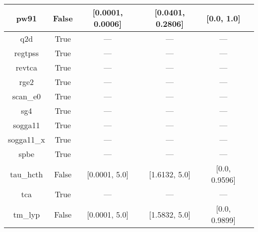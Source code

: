 \begin{tabular}{|c|c|c|c|c|l|}
          pw91 &                 False & [0.0001, 0.0006] & [0.0401, 0.2806] &     [0.0, 1.0] &          \cite{Perdew1991,Perdew1992_6671,Perdew1992_6671_err} \\ \hline
           q2d &                  True &              --- &              --- &            --- &                                       \cite{Chiodo2012_126402} \\ \hline
       regtpss &                  True &              --- &              --- &            --- &                                       \cite{Perdew2009_026403} \\ \hline
        revtca &                  True &              --- &              --- &            --- &                                        \cite{Tognetti2008_536} \\ \hline
          rge2 &                  True &              --- &              --- &            --- &                                      \cite{Ruzsinszky2009_763} \\ \hline
      scan\_e0 &                  True &              --- &              --- &            --- &                                          \cite{Sun2015_036402} \\ \hline
           sg4 &                  True &              --- &              --- &            --- &                                   \cite{Constantin2016_045126} \\ \hline
       sogga11 &                  True &              --- &              --- &            --- &                                       \cite{Peverati2011_1991} \\ \hline
    sogga11\_x &                  True &              --- &              --- &            --- &                                     \cite{Peverati2011_191102} \\ \hline
          spbe &                  True &              --- &              --- &            --- &                                        \cite{Swart2009_094103} \\ \hline
     tau\_hcth &                 False &    [0.0001, 5.0] &    [1.6132, 5.0] &  [0.0, 0.9596] &                                          \cite{Boese2002_9559} \\ \hline
           tca &                  True &              --- &              --- &            --- &                                     \cite{Tognetti2008_034101} \\ \hline
       tm\_lyp &                 False &    [0.0001, 5.0] &    [1.5832, 5.0] &  [0.0, 0.9899] &                                      \cite{Thakkar2009_134109} \\ \hline

\end{tabular}
